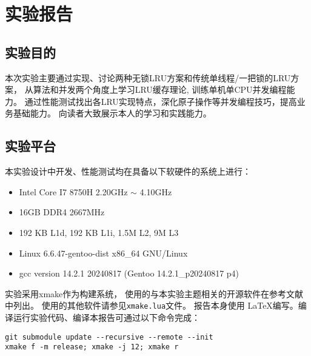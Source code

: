 \maketitle

\begin{abstract}
    本实验分别实现了传统LRU淘汰算法在单线程以及单把锁的多线程版本，用于展示lock contention对性能的影响。
    另外实现了基于无锁队列和智能指针的近似LRU算法、
    类似于Redis方案的采样LRU算法。
    本实验分别对不同线程数量、不同缓存容量以及不同缓存访问行为三个角度出发对上述三种缓存进行性能测试,
    报告还介绍了本实验的三种缓存的部分实现细节以及其对性能的影响.
    对考核和拓展阅读文章的学习总结,
    最后还有本人对系统方向优化工作的感想。
    
    \textbf{关键字:}\quad LRU\quad 采样LRU\quad lock-free\quad 无锁队列\quad 并发编程
\end{abstract}

\section{实验报告}

\subsection{实验目的}

本次实验主要通过实现、讨论两种无锁LRU方案和传统单线程/一把锁的LRU方案，
从算法和并发两个角度上学习LRU缓存理论, 训练单机单CPU并发编程能力。
通过性能测试找出各LRU实现特点，深化原子操作等并发编程技巧，提高业务基础能力。
向读者大致展示本人的学习和实践能力。

\subsection{实验平台}

本实验设计中开发、性能测试均在具备以下软硬件的系统上进行：
\begin{itemize}
    \item Intel Core I7 8750H 2.20GHz $\sim$ 4.10GHz
    \item 16GB DDR4 2667MHz
    \item 192 KB L1d, 192 KB L1i, 1.5M L2, 9M L3
    \item Linux 6.6.47-gentoo-dist x86\_64 GNU/Linux
    \item gcc version 14.2.1 20240817 (Gentoo 14.2.1\_p20240817 p4)
\end{itemize}

实验采用xmake作为构建系统，
使用的与本实验主题相关的开源软件在参考文献中列出。
使用的其他软件请参见\verb|xmake.lua|文件。
报告本身使用 \LaTeX 编写。编译运行实验代码、编译本报告可通过以下命令完成：
\begin{verbatim}
git submodule update --recursive --remote --init
xmake f -m release; xmake -j 12; xmake r
\end{verbatim}

